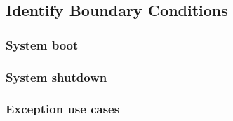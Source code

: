\subsection{Identify Boundary Conditions}
    \subsubsection{System boot}
    
    \subsubsection{System shutdown}
    \subsubsection{Exception use cases}